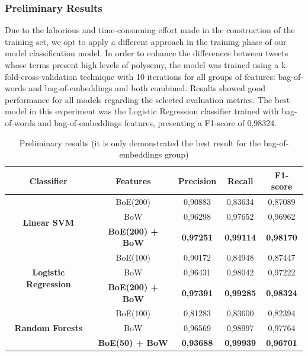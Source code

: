\subsubsection{Preliminary Results}\label{subsec:preliminar_results}
Due to the laborious and time-consuming effort made in the construction of the training set, we opt to apply a different approach in the training phase of our model classification model. In order to enhance the differences between tweets whose terms present high levels of polysemy, the model was trained using a \gls{k-fold-cross-validation} technique with 10 iterations for all groups of features: bag-of-words and bag-of-embeddings and both combined. Results showed good performance for all models regarding the selected evaluation metrics. The best model in this experiment was the Logistic Regression classifier trained with bag-of-words and bag-of-embeddings features, presenting a F1-score of 0,98324.

\begin{table}[!bp]
	\centering
	\caption[New York City First Experiment Results]{Preliminary results (it is only demonstrated the best result for the bag-of-embeddings group)}
	\label{tab:first_experiment}
	\begin{tabular}{|c|c|c|c|c|}
		\hline
		\textbf{Classifier} & \textbf{Features} & \textbf{Precision} & \textbf{Recall} & \textbf{F1-score} \\ \hline
		\multirow{3}{*}{\textbf{Linear SVM}} & BoE(200) & 0,90883 & 0,83634 & 0,87089 \\
		& BoW & 0,96298 & 0,97652 & 0,96962 \\
		& \textbf{BoE(200) + BoW} & \textbf{0,97251} & \textbf{0,99114} & \textbf{0,98170} \\ \hline
		\multirow{3}{*}{\textbf{Logistic Regression}} & BoE(100) & 0,90172 & 0,84948 & 0,87447 \\
		& BoW & 0,96431 & 0,98042 & 0,97222 \\
		& \textbf{BoE(200) + BoW} & \textbf{0,97391} & \textbf{0,99285} & \textbf{0,98324} \\ \hline
		\multirow{3}{*}{\textbf{Random Forests}} & BoE(100) & 0,81283 & 0,83600 & 0,82394 \\
		& BoW & 0,96569 & 0,98997 & 0,97764 \\
		& \textbf{BoE(50) + BoW} & \textbf{0,93688} & \textbf{0,99939} & \textbf{0,96701} \\ \hline
	\end{tabular}
\end{table}

